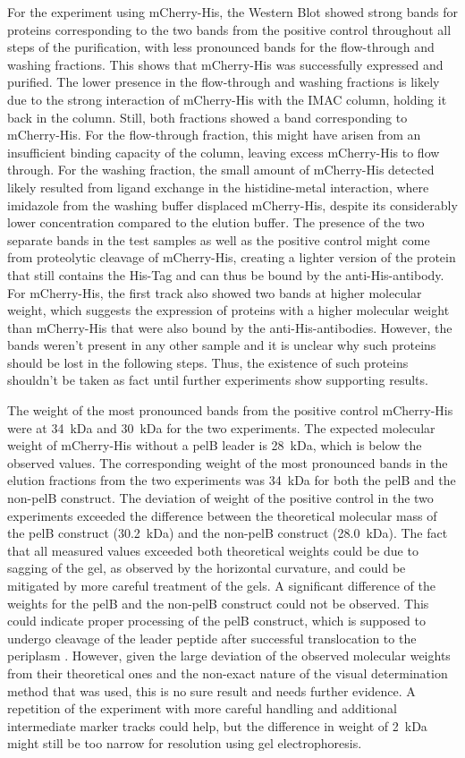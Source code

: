 \documentclass[a4paper,12pt]{article}
\begin{document}
For the experiment using mCherry-His, the Western Blot showed strong bands for proteins corresponding to the two bands from the positive control throughout all steps of the purification, with less pronounced bands for the flow-through and washing fractions. This shows that mCherry-His was successfully expressed and purified. The lower presence in the flow-through and washing fractions is likely due to the strong interaction of mCherry-His with the IMAC column, holding it back in the column. Still, both fractions showed a band corresponding to mCherry-His. For the flow-through fraction, this might have arisen from an insufficient binding capacity of the column, leaving excess mCherry-His to flow through. For the washing fraction, the small amount of mCherry-His detected likely resulted from ligand exchange in the histidine-metal interaction, where imidazole from the washing buffer displaced mCherry-His, despite its considerably lower concentration compared to the elution buffer. The presence of the two separate bands in the test samples as well as the positive control might come from proteolytic cleavage of mCherry-His, creating a lighter version of the protein that still contains the His-Tag and can thus be bound by the anti-His-antibody. For mCherry-His, the first track also showed two bands at higher molecular weight, which suggests the expression of proteins with a higher molecular weight than mCherry-His that were also bound by the anti-His-antibodies. However, the bands weren't present in any other sample and it is unclear why such proteins should be lost in the following steps. Thus, the existence of such proteins shouldn't be taken as fact until further experiments show supporting results.

The weight of the most pronounced bands from the positive control mCherry-His were at 34~kDa and 30~kDa for the two experiments. The expected molecular weight of mCherry-His without a pelB leader is 28~kDa, which is below the observed values. The corresponding weight of the most pronounced bands in the elution fractions from the two experiments was 34~kDa for both the pelB and the non-pelB construct. The deviation of weight of the positive control in the two experiments exceeded the difference between the theoretical molecular mass of the pelB construct (30.2~kDa) and the non-pelB construct (28.0~kDa). The fact that all measured values exceeded both theoretical weights could be due to sagging of the gel, as observed by the horizontal curvature, and could be mitigated by more careful treatment of the gels. A significant difference of the weights for the pelB and the non-pelB construct could not be observed. This could indicate proper processing of the pelB construct, which is supposed to undergo cleavage of the leader peptide after successful translocation to the periplasm \cite{Sockolosky2013}. However, given the large deviation of the observed molecular weights from their theoretical ones and the non-exact nature of the visual determination method that was used, this is no sure result and needs further evidence. A repetition of the experiment with more careful handling and additional intermediate marker tracks could help, but the difference in weight of 2~kDa might still be too narrow for resolution using gel electrophoresis.
\end{document}
